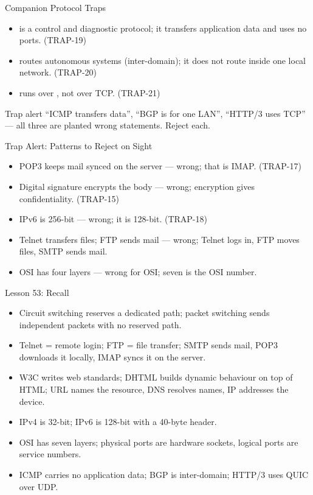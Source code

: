 \documentclass[aspectratio=169]{beamer}
\begin{document}
\begin{frame}{Companion Protocol Traps}
  \begin{itemize}
    \item {} is a control and diagnostic protocol; it transfers
       application data and uses no ports. (TRAP-19)
    \item {} routes  autonomous systems (inter-domain);
      it does not route inside one local network. (TRAP-20)
    \item {} runs over , not over TCP.
      (TRAP-21)
  \end{itemize}
  \begin{alertblock}{Trap alert}
    ``ICMP transfers data'', ``BGP is for one LAN'', ``HTTP/3 uses TCP'' ---
    all three are planted wrong statements. Reject each.
  \end{alertblock}
\end{frame}

\begin{frame}{Trap Alert: Patterns to Reject on Sight}
  \begin{itemize}
    \item POP3 keeps mail synced on the server --- wrong; that is IMAP.
      (TRAP-17)
    \item Digital signature encrypts the body --- wrong; encryption gives
      confidentiality. (TRAP-15)
    \item IPv6 is 256-bit --- wrong; it is 128-bit. (TRAP-18)
    \item Telnet transfers files; FTP sends mail --- wrong; Telnet logs in,
      FTP moves files, SMTP sends mail.
    \item OSI has four layers --- wrong for OSI; seven is the OSI number.
  \end{itemize}
\end{frame}

\begin{frame}{Lesson 53: Recall}
  \begin{itemize}
    \item Circuit switching reserves a dedicated path; packet switching sends
      independent packets with no reserved path.
    \item Telnet = remote login; FTP = file transfer; SMTP sends mail, POP3
      downloads it locally, IMAP syncs it on the server.
    \item W3C writes web standards; DHTML builds dynamic behaviour on top of
      HTML; URL names the resource, DNS resolves names, IP addresses the
      device.
    \item IPv4 is 32-bit; IPv6 is 128-bit with a 40-byte header.
    \item OSI has seven layers; physical ports are hardware sockets, logical
      ports are service numbers.
    \item ICMP carries no application data; BGP is inter-domain; HTTP/3 uses
      QUIC over UDP.
  \end{itemize}
\end{frame}
\end{document}
